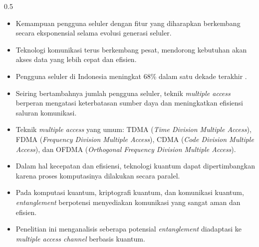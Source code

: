 \begin{frame}
\begin{columns}[T]
        \begin{column}{0.5\textwidth}
            \begin{itemize}\tiny\justifying
                \item Kemampuan pengguna seluler dengan fitur yang diharapkan
                      berkembang secara eksponensial selama evolusi generasi seluler.
                \item Teknologi komunikasi terus berkembang pesat, mendorong
                      kebutuhan akan akses data yang lebih cepat dan efisien.
                \item Pengguna seluler di Indonesia meningkat 68\% dalam satu
                      dekade terakhir \cite{annur2022kepemilikan}.
                \item Seiring bertambahnya jumlah pengguna seluler, teknik
                      \textit{multiple access} berperan mengatasi keterbatasan
                      sumber daya dan meningkatkan efisiensi saluran komunikasi.
                \item Teknik \textit{multiple access} yang umum: TDMA
                      (\textit{Time Division Multiple Access}), FDMA
                      (\textit{Frequency Division Multiple Access}), CDMA
                      (\textit{Code Division Multiple Access}), dan OFDMA
                      (\textit{Orthogonal Frequency Division Multiple Access}).
                \item Dalam hal kecepatan dan efisiensi, teknologi kuantum dapat
                      dipertimbangkan karena proses komputasinya dilakukan
                      secara paralel.
                \item Pada komputasi kuantum, kriptografi kuantum, dan komunikasi
                      kuantum, \textit{entanglement} berpotensi menyediakan
                      komunikasi yang sangat aman dan efisien.
                \item Penelitian ini menganalisis seberapa potensial
                      \textit{entanglement} diadaptasi ke \textit{multiple
                      access channel} berbasis kuantum.
            \end{itemize}
        \end{column}
    \end{columns}
\end{frame}
